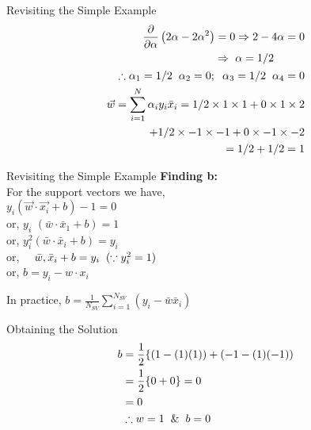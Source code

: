 \documentclass{beamer}
\begin{document}
\begin{frame}{Revisiting the Simple Example}
\begin{align*}
\begin{aligned}
\frac{\partial}{\partial \alpha}\left(2 \alpha- 2\alpha^{2}\right)=0 & \Rightarrow 2-4 \alpha=0 \\
\Rightarrow \hspace{2mm}& \alpha=1/2\\
\end{aligned}\\
\therefore \alpha_{1}=1/2 \hspace{2mm} \alpha_{2}=0 ; \hspace{2mm} \alpha_{3}=1/2 \hspace{2mm} \alpha_{4}=0
\\
\vec{w}=\sum_{i=1}^{N} \alpha_{i} y_{i} \bar{x}_{i} =1/2 \times 1 \times 1+0 \times 1 \times 2 \\
+ 1/2 \times -1 \times -1 + 0\times -1 \times -2 \\
 = 1/2 + 1/2 = 1
\end{align*}
\end{frame}

\begin{frame}{Revisiting the Simple Example}
\textbf{Finding b:}\\
For the support vectors we have, \\

$y_{i}(\vec{w} \cdot \overrightarrow{x_{i}}+b)-1=0$\\
or, $y_{i}$ $\left(\bar{w} \cdot \bar{x}_{1}+b\right)=1$\\
or, $y_{i}^{2}\left(\bar{w} \cdot \bar{x}_{i}+b\right)=y_{i}$\\
or, $\quad \bar{w}, \bar{x}_{i}+b=y_{i} \hspace{2mm}(\because y_{i}^{2} = 1)$\\
or, $b= y_i - w \cdot x_i$

In practice, $b=\frac{1}{N_{SV}} \sum_{i=1}^{N_{SV}}\left(y_{i}-\bar{w}\bar{x}_{i}\right)$

\end{frame}

\begin{frame}{Obtaining the Solution}
\begin{align*}
\begin{aligned}
b &=\frac{1}{2}\{(1-(1)(1))+(-1-(1)(-1))\\
&=\frac{1}{2}\{0+0\}=0 \\
&=0 \\
& \therefore w = 1 \hspace{2mm}\& \hspace{2mm} b = 0
\end{aligned}
\end{align*}
\end{frame}
\end{document}
